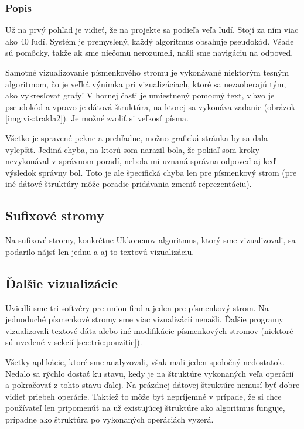 \subsubsection{Popis}

Už na prvý pohľad je vidieť, že na projekte sa podieľa veľa ľudí. Stojí za ním 
viac ako 40 ľudí. Systém je premyslený, každý algoritmus obsahuje pseudokód. 
Všade sú pomôcky, takže ak sme niečomu nerozumeli, našli sme navigáciu na 
odpoveď. 

Samotné vizualizovanie písmenkového stromu je vykonávané niektorým tesným 
algoritmom, čo je veľká výnimka pri vizualizáciach, ktoré sa nezaoberajú tým, 
ako vykresľovať grafy! V hornej časti je umiestnený pomocný text, vľavo je 
pseudokód a vpravo je dátová štruktúra, na ktorej sa vykonáva zadanie (obrázok 
\ref{img:vis:trakla2}). Je možné zvoliť si veľkosť písma.

Všetko je spravené pekne a prehľadne, možno grafická stránka by sa dala 
vylepšiť. Jediná chyba, na ktorú som narazil bola, že pokiaľ som kroky 
nevykonával v správnom poradí, nebola mi uznaná správna odpoveď aj keď 
výsledok správny bol. Toto je ale špecifická chyba len pre písmenkový strom 
(pre iné dátové štruktúry môže poradie pridávania zmeniť reprezentáciu).

\subsection{Sufixové stromy}

Na sufixové stromy, konkrétne Ukkonenov algoritmus, ktorý sme vizualizovali, 
sa podarilo nájsť len jednu a aj to textovú vizualizáciu. 

\subsection{Ďalšie vizualizácie}

Uviedli sme tri softvéry pre union-find a jeden pre písmenkový 
strom. Na jednoduché 
písmenkové stromy sme viac vizualizácií nenašli. Ďalšie programy vizualizovali 
textové dáta alebo iné modifikácie písmenkových stromov (niektoré sú uvedené v 
sekcií \ref{sec:trie:pouzitie}).

Všetky aplikácie, ktoré sme analyzovali, však mali jeden spoločný nedostatok. 
Nedalo sa rýchlo dostať ku stavu, kedy je na štruktúre vykonaných veľa operácií 
a pokračovať z tohto stavu ďalej. Na prázdnej dátovej štruktúre nemusí byť 
dobre vidieť priebeh operácie. Taktiež to môže byť nepríjemné v prípade, že si 
chce používateľ len pripomenúť na už existujúcej štruktúre ako algoritmus 
funguje, prípadne ako štruktúra po vykonaných operáciách vyzerá.

